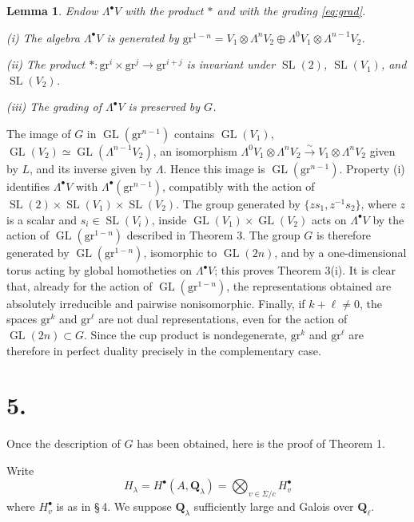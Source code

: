 \documentclass[11pt,a4paper]{article}
\theoremstyle{plain}
\newtheorem{lemma}[theorem]{Lemma}
\theoremstyle{definition}
\DeclareMathOperator{\SL}{SL}
\DeclareMathOperator{\GL}{GL}
\begin{document}
\begin{lemma}\label{lem:4.1}
Endow $\Lambda^\bullet V$ with the product $*$ and with the grading \eqref{eq:grad}.

\emph{(i)} The algebra $\Lambda^\bullet V$ is generated by $\mathrm{gr}^{1-n} = V_1 \otimes \Lambda^n V_2 \oplus \Lambda^0 V_1 \otimes \Lambda^{n-1} V_2$.

\emph{(ii)} The product $* : \mathrm{gr}^i \times \mathrm{gr}^j \to \mathrm{gr}^{i+j}$ is invariant under $\SL(2)$, $\SL(V_1)$, and $\SL(V_2)$.

\emph{(iii)} The grading of $\Lambda^\bullet V$ is preserved by $G$.
\end{lemma}

The image of $G$ in $\GL(\mathrm{gr}^{n-1})$ contains $\GL(V_1)$, $\GL(V_2) \simeq \GL(\Lambda^{n-1} V_2)$, an isomorphism $\Lambda^0 V_1 \otimes \Lambda^n V_2 \xrightarrow{\sim} V_1 \otimes \Lambda^n V_2$ given by $L$, and its inverse given by $\Lambda$. Hence this image is $\GL(\mathrm{gr}^{n-1})$. Property (i) identifies $\Lambda^\bullet V$ with $\Lambda^\bullet(\mathrm{gr}^{n-1})$, compatibly with the action of $\SL(2) \times \SL(V_1) \times \SL(V_2)$. The group generated by $\{zs_1, z^{-1}s_2\}$, where $z$ is a scalar and $s_i \in \SL(V_i)$, inside $\GL(V_1) \times \GL(V_2)$ acts on $\Lambda^\bullet V$ by the action of $\GL(\mathrm{gr}^{1-n})$ described in Theorem 3. The group $G$ is therefore generated by $\GL(\mathrm{gr}^{1-n})$, isomorphic to $\GL(2n)$, and by a one-dimensional torus acting by global homotheties on $\Lambda^\bullet V$; this proves Theorem 3(i). It is clear that, already for the action of $\GL(\mathrm{gr}^{1-n})$, the representations obtained are absolutely irreducible and pairwise nonisomorphic. Finally, if $k + \ell \neq 0$, the spaces $\mathrm{gr}^k$ and $\mathrm{gr}^\ell$ are not dual representations, even for the action of $\GL(2n) \subset G$. Since the cup product is nondegenerate, $\mathrm{gr}^k$ and $\mathrm{gr}^\ell$ are therefore in perfect duality precisely in the complementary case.

\section*{5.}

Once the description of $G$ has been obtained, here is the proof of Theorem 1.

Write
\[
H_\lambda = H^\bullet(A, \mathbf{Q}_\lambda) = \bigotimes_{v \in \Sigma/c} H_v^\bullet
\]
where $H_v^\bullet$ is as in \S\,4. We suppose $\mathbf{Q}_\lambda$ sufficiently large and Galois over $\mathbf{Q}_\ell$.
\end{document}
